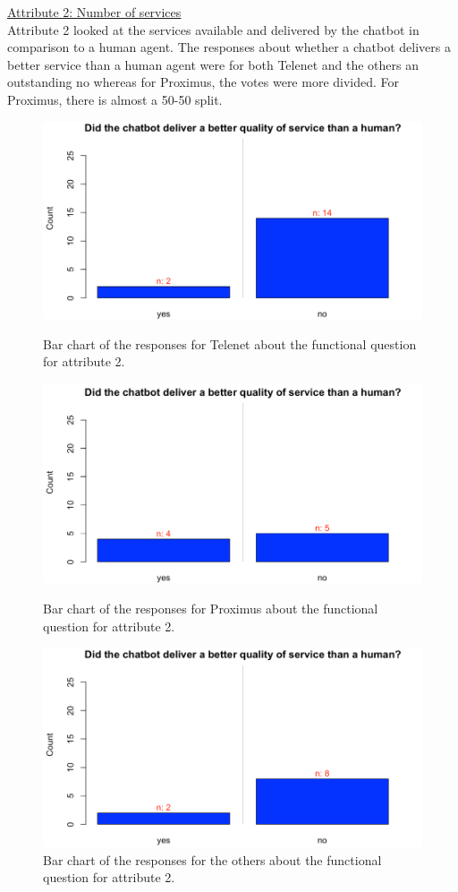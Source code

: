 \break
\ul{Attribute 2: Number of services}\\
\break
Attribute 2 looked at the services available and delivered by the chatbot in comparison to a human agent. The responses about whether a chatbot delivers a better service than a human agent were for both Telenet and the others an outstanding no whereas for Proximus, the votes were more divided. For Proximus, there is almost a 50-50 split.\\
\begin{figure}[!htb]
	\includegraphics[width=\linewidth]{../LaTeX/Figures/Comparative/Q2T.png}
	\caption{Bar chart of the responses for Telenet about the functional question for attribute 2.}\label{fig:Q2T}
	\endminipage\hfill
	\includegraphics[width=\linewidth]{../LaTeX/Figures/Comparative/Q2P.png}
	\caption{Bar chart of the responses for Proximus about the functional question for attribute 2.}\label{fig:Q2P}
	\endminipage\hfill
	\includegraphics[width=\linewidth]{../LaTeX/Figures/Comparative/Q2O.png}
	\caption{Bar chart of the responses for the others about the functional question for attribute 2.}\label{fig:Q2O}
	\endminipage\hfill
\end{figure}
